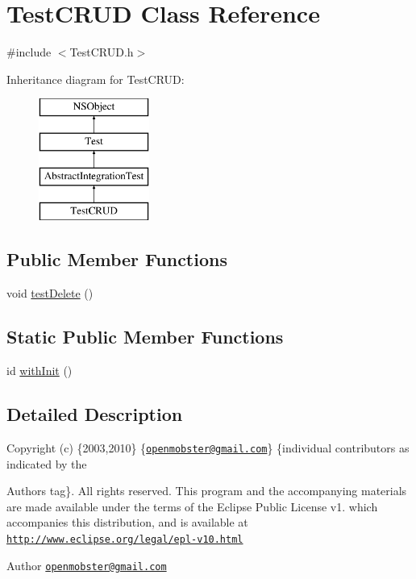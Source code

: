 \hypertarget{interface_test_c_r_u_d}{
\section{\-Test\-C\-R\-U\-D \-Class \-Reference}
\label{interface_test_c_r_u_d}
}


{\ttfamily \#include $<$\-Test\-C\-R\-U\-D.\-h$>$}

\-Inheritance diagram for \-Test\-C\-R\-U\-D\-:\begin{figure}[H]
\begin{center}
\leavevmode
\includegraphics[height=4.000000cm]{interface_test_c_r_u_d}
\end{center}
\end{figure}
\subsection*{\-Public \-Member \-Functions}
\begin{DoxyCompactItemize}
\item 
void \hyperlink{interface_test_c_r_u_d_ac2354eca454cb0ff32180edf88282af1}{test\-Delete} ()
\end{DoxyCompactItemize}
\subsection*{\-Static \-Public \-Member \-Functions}
\begin{DoxyCompactItemize}
\item 
id \hyperlink{interface_test_c_r_u_d_a10d4c707c8fcc0bb6f1450169b3e4601}{with\-Init} ()
\end{DoxyCompactItemize}


\subsection{\-Detailed \-Description}
\-Copyright (c) \{2003,2010\} \{\href{mailto:openmobster@gmail.com}{\tt openmobster@gmail.\-com}\} \{individual contributors as indicated by the \begin{DoxyAuthor}{\-Authors}
tag\}. \-All rights reserved. \-This program and the accompanying materials are made available under the terms of the \-Eclipse \-Public \-License v1. which accompanies this distribution, and is available at \href{http://www.eclipse.org/legal/epl-v10.html}{\tt http\-://www.\-eclipse.\-org/legal/epl-\/v10.\-html}
\end{DoxyAuthor}
\begin{DoxyAuthor}{\-Author}
\href{mailto:openmobster@gmail.com}{\tt openmobster@gmail.\-com} 
\end{DoxyAuthor}


